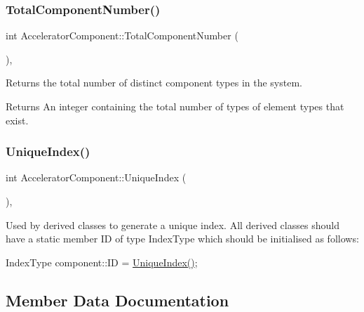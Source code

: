 \subsubsection{\texorpdfstring{Total\+Component\+Number()}{TotalComponentNumber()}}
{\footnotesize\ttfamily int Accelerator\+Component\+::\+Total\+Component\+Number (\begin{DoxyParamCaption}{ }\end{DoxyParamCaption})\hspace{0.3cm}{\ttfamily [inline]}, {\ttfamily [static]}}

Returns the total number of distinct component types in the system. \begin{DoxyReturn}{Returns}
An integer containing the total number of types of element types that exist. 
\end{DoxyReturn}
\mbox{\label{classAcceleratorComponent_aa7ad4d39e1a488b705983842ed1ac784}} 
\subsubsection{\texorpdfstring{Unique\+Index()}{UniqueIndex()}}
{\footnotesize\ttfamily int Accelerator\+Component\+::\+Unique\+Index (\begin{DoxyParamCaption}{ }\end{DoxyParamCaption})\hspace{0.3cm}{\ttfamily [static]}, {\ttfamily [protected]}}

Used by derived classes to generate a unique index. All derived classes should have a static member ID of type Index\+Type which should be initialised as follows\+:

Index\+Type component\+::\+ID = \hyperlink{classAcceleratorComponent_aa7ad4d39e1a488b705983842ed1ac784}{Unique\+Index()}; 

\subsection{Member Data Documentation}
\mbox{\label{classAcceleratorComponent_a73212fc2b6e9f0f71eca5cd633bd5d2f}} 
